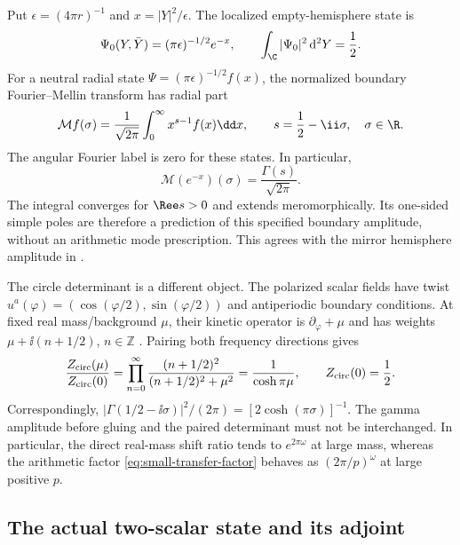 Put $\epsilon=(4\pi r)^{-1}$ and $x=|Y|^2/\epsilon$. The localized
empty-hemisphere state is
\begin{equation}\label{eq:localized-vacuum}
 \Psi_0(Y,\bar Y)=(\pi\epsilon)^{-1/2}e^{-x},\qquad
 \int_{\C}|\Psi_0|^2\,\mathrm d^2Y=\frac12.
\end{equation}
For a neutral radial state
$\Psi=(\pi\epsilon)^{-1/2}f(x)$, the normalized boundary
Fourier--Mellin transform has radial part
\begin{equation}\label{eq:localized-mellin}
 \mathcal Mf(\sigma)=\frac1{\sqrt{2\pi}}
   \int_0^\infty x^{s-1}f(x)\dd x,\qquad
 s=\frac12-\ii\sigma,\quad \sigma\in\R.
\end{equation}
The angular Fourier label is zero for these states. In particular,
\begin{equation}\label{eq:localized-gamma}
 \mathcal M(e^{-x})(\sigma)=\frac{\Gamma(s)}{\sqrt{2\pi}}.
\end{equation}
The integral converges for $\Ree s>0$ and extends meromorphically.
Its one-sided simple poles are therefore a prediction of this
specified boundary amplitude, without an arithmetic mode prescription.
This agrees with the mirror hemisphere amplitude in
\cite[equations~(135)--(140)]{DedushenkoGluing}.

The circle determinant is a different object. The polarized scalar
fields have twist
$u^a(\varphi)=(\cos(\varphi/2),\sin(\varphi/2))$ and antiperiodic
boundary conditions. At fixed real mass/background $\mu$, their
kinetic operator is $\partial_\varphi+\mu$ and has weights
$\mu+\ii(n+1/2)$, $n\in\mathbb Z$
\cite[Section~6.1]{DPYHiggs}. Pairing both frequency directions gives
\begin{equation}\label{eq:localized-circle}
 \frac{Z_{\rm circ}(\mu)}{Z_{\rm circ}(0)}
 =\prod_{n=0}^\infty
   \frac{(n+1/2)^2}{(n+1/2)^2+\mu^2}
 =\frac1{\cosh\pi\mu},\qquad
 Z_{\rm circ}(0)=\frac12.
\end{equation}
Correspondingly,
$|\Gamma(1/2-\ii\sigma)|^2/(2\pi)
 =[2\cosh(\pi\sigma)]^{-1}$.
The gamma amplitude before gluing and the paired determinant
must not be interchanged. In particular, the direct real-mass
shift ratio tends to $e^{2\pi\omega}$ at large mass, whereas
the arithmetic factor \eqref{eq:small-transfer-factor} behaves
as $(2\pi/p)^\omega$ at large positive $p$.

\subsection{The actual two-scalar state and its adjoint}
\label{subsec:localized-pair}

